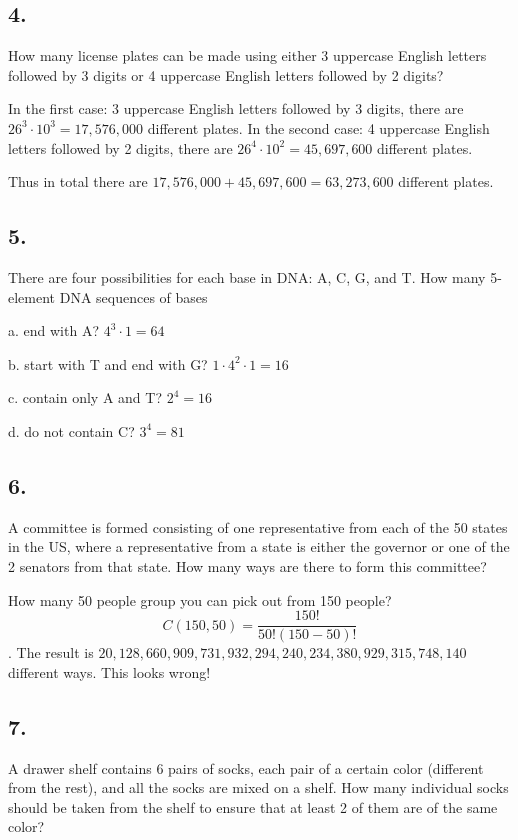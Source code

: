 \documentclass{article}
\begin{document}
\subsection*{4.}
 How many license plates can be made using either 3 uppercase English letters followed by 3 digits or 4 uppercase English letters followed by 2 digits?

In the first case: 3 uppercase English letters followed by 3 digits, there are $26^3 \cdot 10^3 = 17,576,000$ different plates.
In the second case: 4 uppercase English letters followed by 2 digits, there are $26^4 \cdot 10^2 = 45,697,600$ different plates.

Thus in total there are $17,576,000 + 45,697,600 = 63,273,600$ different plates.

\subsection*{5.}
There are four possibilities for each base in DNA: A, C, G, and T. How many 5-element DNA sequences of bases

a. end with A? $4^3 \cdot 1 = 64$

b. start with T and end with G? $1 \cdot 4^2 \cdot 1 = 16$

c. contain only A and T? $ 2^4 = 16$

d. do not contain C? $3^4 = 81$

\subsection*{6.}
A committee is formed consisting of one representative from each of the 50 states in the US, where a representative from a state is either the governor or one of the 2 senators from that state. How many ways are there to form this committee?

How many 50 people group you can pick out from 150 people? $$C(150,50) = \frac{150!}{50!(150-50)!}$$. 
The result is $20,128,660,909,731,932,294,240,234,380,929,315,748,140$ different ways. This looks wrong!

\subsection*{7.}
A drawer shelf contains 6 pairs of socks, each pair of a certain color (different from the rest), and all the socks are mixed on a shelf. How many individual socks should be taken from the shelf to ensure that at least 2 of them are of the same color?
\end{document}
